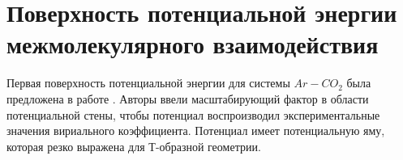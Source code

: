 \section{Поверхность потенциальной энергии межмолекулярного взаимодействия}

Первая поверхность потенциальной энергии для системы $Ar-CO_2$ была предложена в работе \cite{parker1976}. Авторы ввели масштабирующий фактор в области потенциальной стены, чтобы потенциал воспроизводил экспериментальные значения вириального коэффициента. Потенциал имеет потенциальную яму, которая резко выражена для Т-образной геометрии.


